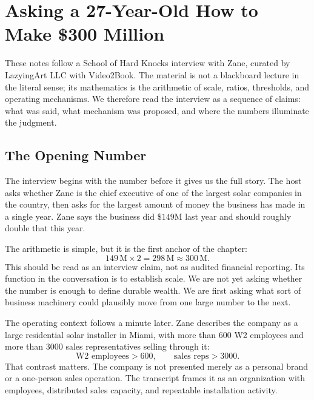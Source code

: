 \chapter{Asking a 27-Year-Old How to Make \$300 Million}

These notes follow a School of Hard Knocks interview with Zane, curated by LazyingArt LLC with Video2Book. The material is not a blackboard lecture in the literal sense; its mathematics is the arithmetic of scale, ratios, thresholds, and operating mechanisms. We therefore read the interview as a sequence of claims: what was said, what mechanism was proposed, and where the numbers illuminate the judgment.

\section{The Opening Number}

The interview begins with the number before it gives us the full story. The host asks whether Zane is the chief executive of one of the largest solar companies in the country, then asks for the largest amount of money the business has made in a single year. Zane says the business did \(\$149\mathrm{M}\) last year and should roughly double that this year.

The arithmetic is simple, but it is the first anchor of the chapter:
\begin{equation}
149\,\mathrm{M}\times 2 = 298\,\mathrm{M}\approx 300\,\mathrm{M}.
\end{equation}
This should be read as an interview claim, not as audited financial reporting. Its function in the conversation is to establish scale. We are not yet asking whether the number is enough to define durable wealth. We are first asking what sort of business machinery could plausibly move from one large number to the next.

The operating context follows a minute later. Zane describes the company as a large residential solar installer in Miami, with more than \(600\) W2 employees and more than \(3000\) sales representatives selling through it:
\begin{equation}
\text{W2 employees}>600,\qquad \text{sales reps}>3000.
\end{equation}
That contrast matters. The company is not presented merely as a personal brand or a one-person sales operation. The transcript frames it as an organization with employees, distributed sales capacity, and repeatable installation activity.

